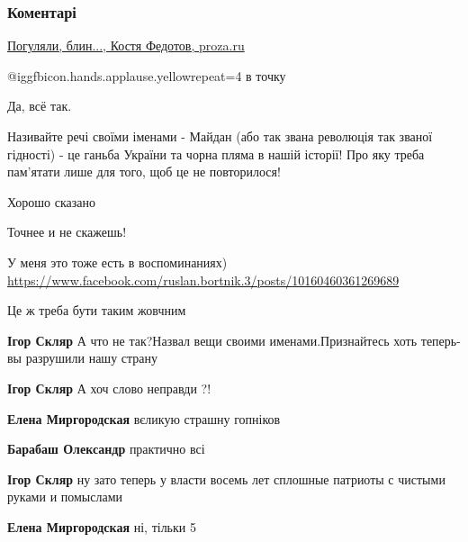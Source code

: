  
 
 
 
 
\subsubsection{Коментарі}

\begin{itemize} %

\href{https://proza.ru/2014/11/22/985}{
Погуляли, блин..., Костя Федотов, proza.ru%
}

 @igg{fbicon.hands.applause.yellow}{repeat=4} в точку

Да, всё так.


Називайте речі своїми іменами - Майдан (або так звана революція так званої
гідності) - це ганьба України та чорна пляма в нашій історії! Про яку треба
пам’ятати лише для того, щоб це не повторилося!


Хорошо сказано

Точнее и не скажешь!

У меня это тоже есть в воспоминаниях) \url{https://www.facebook.com/ruslan.bortnik.3/posts/10160460361269689}

Це ж треба бути таким жовчним

\begin{itemize} %
\textbf{Ігор Скляр} А что не так?Назвал вещи своими именами.Признайтесь хоть теперь-вы разрушили нашу страну

\textbf{Ігор Скляр} А хоч слово неправди ?!

\textbf{Елена Миргородская} вєликую страшну гопніков

\textbf{Барабаш Олександр} практично всі

\textbf{Ігор Скляр} ну зато теперь у власти восемь лет сплошные патриоты с чистыми руками и помыслами

\textbf{Елена Миргородская} ні, тільки 5


\end{itemize}
\end{itemize}
